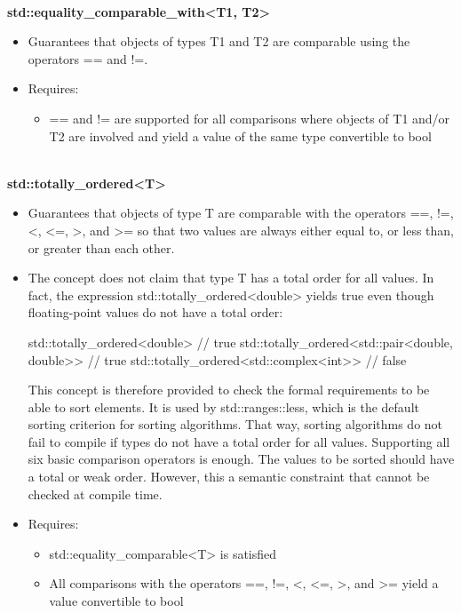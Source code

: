 \noindent
\hspace*{\fill} \\ %
\textbf{std::equality\_comparable\_with<T1, T2>}

\begin{itemize}
\item
Guarantees that objects of types T1 and T2 are comparable using the operators == and !=.

\item
Requires:
\begin{itemize}
\item
== and != are supported for all comparisons where objects of T1 and/or T2 are involved and yield a value of the same type convertible to bool
\end{itemize}
\end{itemize}



\noindent
\hspace*{\fill} \\ %
\textbf{std::totally\_ordered<T>}

\begin{itemize}
\item
Guarantees that objects of type T are comparable with the operators ==, !=, <, <=, >, and >= so that two values are always either equal to, or less than, or greater than each other.

\item
The concept does not claim that type T has a total order for all values. In fact, the expression std::totally\_ordered<double> yields true even though floating-point values do not have a total order:

\begin{cpp}
std::totally_ordered<double> // true
std::totally_ordered<std::pair<double, double>> // true
std::totally_ordered<std::complex<int>> // false
\end{cpp}

This concept is therefore provided to check the formal requirements to be able to sort elements. It is used by std::ranges::less, which is the default sorting criterion for sorting algorithms. That way, sorting algorithms do not fail to compile if types do not have a total order for all values. Supporting all six basic comparison operators is enough. The values to be sorted should have a total or weak order. However, this a semantic constraint that cannot be checked at compile time.

\item
Requires:
\begin{itemize}
\item
std::equality\_comparable<T> is satisfied

\item
All comparisons with the operators ==, !=, <, <=, >, and >= yield a value convertible to bool
\end{itemize}
\end{itemize}

